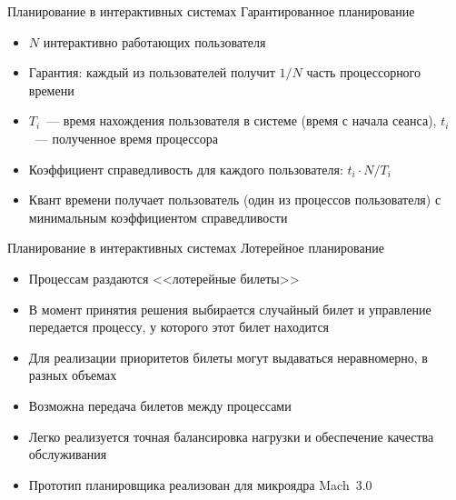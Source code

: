\documentclass[aspectratio=169,14pt]{beamer}
\begin{document}
\begin{frame}{Планирование в интерактивных системах}
    Гарантированное планирование
    \begin{itemize}
        \item $N$ интерактивно работающих пользователя
        \item Гарантия: каждый из пользователей получит $1/N$ часть
        процессорного времени
        \item $T_i$~--- время нахождения пользователя в системе (время с
        начала сеанса), $t_i$~--- полученное время процессора
        \item Коэффициент справедливость для каждого пользователя: $t_i \cdot N / T_i$
        \item Квант времени получает пользователь (один из процессов
        пользователя) с минимальным коэффициентом справедливости
    \end{itemize}
\end{frame}

\begin{frame}{Планирование в интерактивных системах}
    Лотерейное планирование
    \begin{itemize}
        \item Процессам раздаются <<лотерейные билеты>>
        \item В момент принятия решения выбирается случайный билет и
        управление передается процессу, у которого этот билет находится
        \item Для реализации приоритетов билеты могут выдаваться неравномерно,
        в разных объемах
        \item Возможна передача билетов между процессами
        \item Легко реализуется точная балансировка нагрузки и обеспечение
        качества обслуживания
        \item Прототип планировщика реализован для микроядра Mach~3.0
    \end{itemize}
\end{frame}
\end{document}
